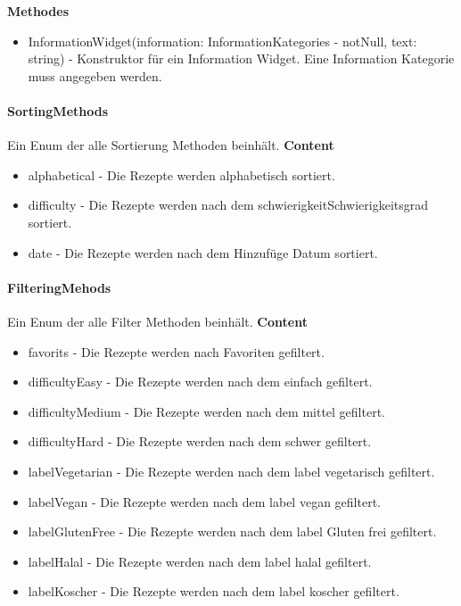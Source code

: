 \documentclass[parskip=full]{scrartcl}
\begin{document}
            \textbf{Methodes}
                \begin{itemize}
                    \item InformationWidget(information: InformationKategories - notNull, text: string) - Konstruktor für ein Information Widget. Eine Information Kategorie muss angegeben werden.
                \end{itemize}

        \paragraph{SortingMethods}
        Ein Enum der alle Sortierung Methoden beinhält.
            \textbf{Content}
            \begin{itemize}
                \item  alphabetical - Die Rezepte werden alphabetisch sortiert.
                \item  difficulty - Die Rezepte werden nach dem \gls{schwierigkeit}{Schwierigkeitsgrad} sortiert.
                \item  date - Die Rezepte werden nach dem Hinzufüge Datum sortiert.
            \end{itemize}
            
        \paragraph{FilteringMehods}
        Ein Enum der alle Filter Methoden beinhält.
            \textbf{Content}
            \begin{itemize}
                \item favorits - Die Rezepte werden nach Favoriten gefiltert.
                \item difficultyEasy - Die Rezepte werden nach dem  einfach gefiltert.
                \item difficultyMedium - Die Rezepte werden nach dem  mittel gefiltert.
                \item difficultyHard - Die Rezepte werden nach dem  schwer gefiltert.
                \item labelVegetarian - Die Rezepte werden nach dem \gls{label} vegetarisch gefiltert.
                \item labelVegan - Die Rezepte werden nach dem \gls{label} vegan gefiltert.
                \item labelGlutenFree - Die Rezepte werden nach dem \gls{label} Gluten frei gefiltert.
                \item labelHalal - Die Rezepte werden nach dem \gls{label} halal gefiltert.
                \item labelKoscher - Die Rezepte werden nach dem \gls{label} koscher gefiltert.
            \end{itemize}
            
\end{document}
